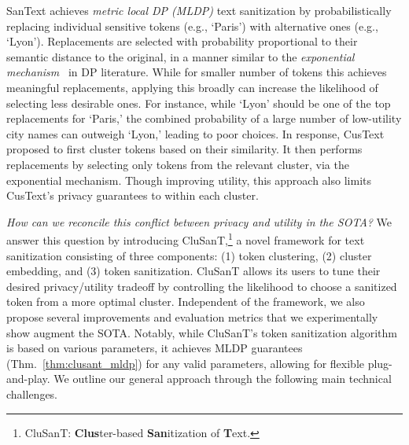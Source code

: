 \documentclass[11pt]{article}
\newcommand{\clusant}{CluSanT\xspace}
\begin{document}
SanText achieves {\em metric local DP (MLDP)} text sanitization by probabilistically replacing individual sensitive tokens (e.g., `Paris') with alternative ones (e.g., `Lyon'). Replacements are selected with probability proportional to their semantic distance to the original, in a manner similar to the {\em exponential mechanism}~\cite{mcsherry2007mechanism} in DP literature. 
While for smaller number of tokens this achieves meaningful replacements, applying this broadly can 
increase the likelihood of selecting less desirable ones. 
%
For instance, while `Lyon' should be one of the top replacements for `Paris,' the combined probability of a large number of low-utility city names can outweigh `Lyon,' leading to poor choices.
%
%
In response, CusText proposed to first cluster tokens based on their similarity. It then performs replacements by selecting only tokens from the relevant cluster, via the exponential mechanism.  
%
Though improving utility, this approach also limits CusText's privacy guarantees to within each cluster.


{\em How can we reconcile this conflict between privacy and utility in the SOTA?} We answer this question by introducing \clusant,\footnote{\clusant: \textbf{Clus}ter-based \textbf{San}itization of \textbf{T}ext.} a novel framework for text sanitization consisting of three components: (1) token clustering, (2) cluster embedding, and (3) token sanitization. \clusant  allows its users to tune their desired privacy/utility tradeoff by controlling the likelihood to choose a sanitized token from a more optimal cluster. Independent of the framework, we also propose several improvements and evaluation metrics that we experimentally show augment the SOTA.  
Notably, while \clusant's token sanitization algorithm is based on various parameters, %
it achieves MLDP guarantees (Thm.~\ref{thm:clusant_mldp}) for any valid parameters, allowing for flexible plug-and-play. 
We outline our general approach through the following main technical challenges.
\end{document}
